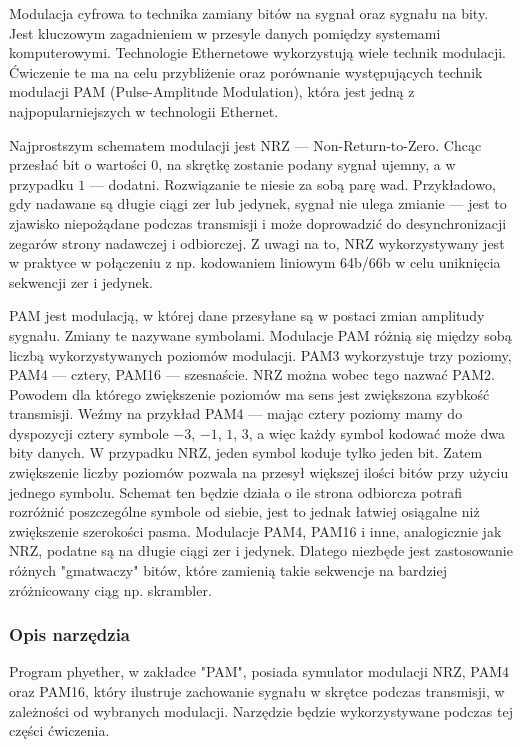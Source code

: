 Modulacja cyfrowa to technika zamiany bitów na sygnał oraz sygnału na bity. Jest kluczowym zagadnieniem w przesyle danych pomiędzy systemami
komputerowymi. Technologie Ethernetowe wykorzystują wiele technik modulacji. Ćwiczenie te ma na celu przybliżenie oraz porównanie
występujących technik modulacji PAM (Pulse-Amplitude Modulation), która jest jedną z najpopularniejszych w technologii Ethernet.

Najprostszym schematem modulacji jest NRZ --- Non-Return-to-Zero. Chcąc przesłać bit o wartości $0$, na skrętkę zostanie podany sygnał
ujemny, a w przypadku $1$ --- dodatni. Rozwiązanie te niesie za sobą parę wad. Przykładowo, gdy nadawane są długie ciągi zer lub jedynek, sygnał
nie ulega zmianie --- jest to zjawisko niepożądane podczas transmisji i może doprowadzić do desynchronizacji zegarów strony nadawczej i odbiorczej.
Z uwagi na to, NRZ wykorzystywany jest w praktyce w połączeniu z np. kodowaniem liniowym 64b/66b w celu uniknięcia sekwencji zer i jedynek.

PAM jest modulacją, w której dane przesyłane są w postaci zmian amplitudy sygnału. Zmiany te nazywane symbolami. Modulacje PAM różnią się między sobą
liczbą wykorzystywanych poziomów modulacji. PAM3 wykorzystuje trzy poziomy, PAM4 --- cztery, PAM16 --- szesnaście. NRZ można wobec tego nazwać PAM2.
Powodem dla którego zwiększenie poziomów ma sens jest zwiększona szybkość transmisji. Weźmy na przykład PAM4 --- mając cztery poziomy mamy
do dyspozycji cztery symbole $-3$, $-1$, $1$, $3$, a więc każdy symbol kodować może dwa bity danych. W przypadku NRZ, jeden symbol koduje tylko jeden bit.
Zatem zwiększenie liczby poziomów pozwala na przesył większej ilości bitów przy użyciu jednego symbolu. Schemat ten będzie działa o ile strona odbiorcza
potrafi rozróżnić poszczególne symbole od siebie, jest to jednak łatwiej osiągalne niż zwiększenie szerokości pasma.
Modulacje PAM4, PAM16 i inne, analogicznie jak NRZ, podatne są na długie ciągi zer i jedynek. Dlatego niezbęde jest zastosowanie różnych "gmatwaczy" bitów, które
zamienią takie sekwencje na bardziej zróżnicowany ciąg np. skrambler.

\subsubsection{Opis narzędzia}

Program phyether, w zakładce "PAM", posiada symulator modulacji NRZ, PAM4 oraz PAM16, który ilustruje zachowanie sygnału w skrętce podczas transmisji, w zależności
od wybranych modulacji.
Narzędzie będzie wykorzystywane podczas tej części ćwiczenia.

